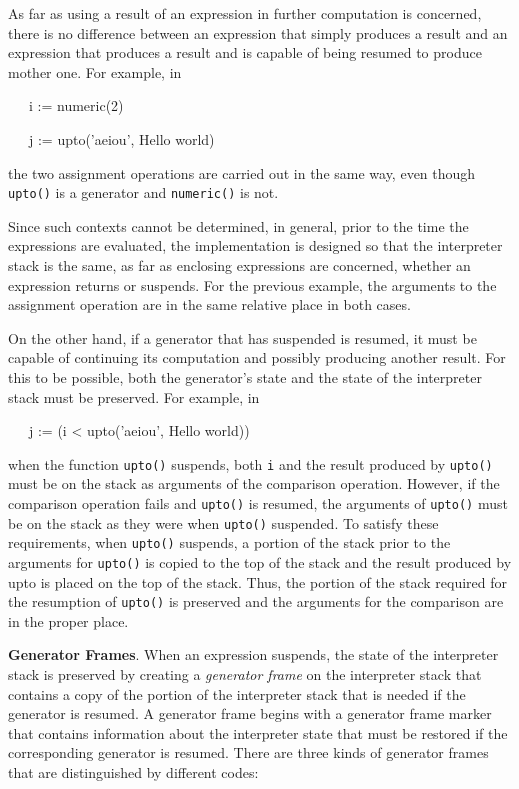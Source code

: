 As far as using a result of an expression in further computation is
concerned, there is no difference between an expression that simply
produces a result and an expression that produces a result and is
capable of being resumed to produce mother one. For example, in

{\ttfamily\mdseries
\ \ \ i := numeric({\textquotedbl}2{\textquotedbl})}

{\ttfamily\mdseries
\ \ \ j := upto('aeiou', {\textquotedbl}Hello world{\textquotedbl})}

\noindent the two assignment operations are carried out in the same
way, even though \texttt{upto()} is a generator and \texttt{numeric()}
is not.

Since such contexts cannot be determined, in general, prior to the
time the expressions are evaluated, the implementation is designed so
that the interpreter stack is the same, as far as enclosing
expressions are concerned, whether an expression returns or
suspends. For the previous example, the arguments to the assignment
operation are in the same relative place in both cases.

On the other hand, if a generator that has suspended is resumed, it
must be capable of continuing its computation and possibly producing
another result. For this to be possible, both the generator's state
and the state of the interpreter stack must be preserved. For example,
in

{\ttfamily\mdseries
\ \ \ j := (i {\textless} upto('aeiou', {\textquotedbl}Hello world{\textquotedbl}))}

\noindent when the function \texttt{upto()} suspends, both \texttt{i}
and the result produced by \texttt{upto()} must be on the stack as
arguments of the comparison operation. However, if the comparison
operation fails and \texttt{upto()} is resumed, the arguments of
\texttt{upto()} must be on the stack as they were when \texttt{upto()}
suspended. To satisfy these requirements, when \texttt{upto()}
suspends, a portion of the stack prior to the arguments for
\texttt{upto()} is copied to the top of the stack and the result
produced by upto is placed on the top of the stack. Thus, the portion
of the stack required for the resumption of \texttt{upto()} is
preserved and the arguments for the comparison are in the proper
place.

\textbf{Generator Frames}. When an expression suspends, the state of
the interpreter stack is preserved by creating a \textit{generator
frame} on the interpreter stack that contains a copy of the portion of
the interpreter stack that is needed if the generator is resumed. A
generator frame begins with a generator frame marker that contains
information about the interpreter state that must be restored if the
corresponding generator is resumed. There are three kinds of generator
frames that are distinguished by different codes:


